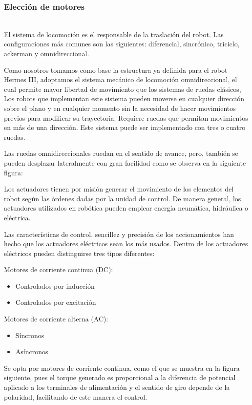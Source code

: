 \subsubsection{Elección de motores} \mbox{} \vspace{10pt} \\
El sistema de locomoción es el responsable de la traslación del robot. Las configuraciones más comunes son las siguientes: diferencial, sincrónico, triciclo, ackerman y omnidireccional.

Como nosotros tomamos como base la estructura ya definida para el robot Hermes III, adoptamos el sistema mecánico de locomoción omnidireccional, el cual permite mayor libertad de movimiento que los sistemas de ruedas clásicos, Los robots que implementan este sistema pueden moverse en cualquier dirección sobre el plano y en cualquier momento sin la necesidad de hacer movimientos previos para modificar su trayectoria. Requiere ruedas que permitan movimientos en más de una dirección. Este sistema puede ser implementado con tres o cuatro ruedas.

Las ruedas omnidireccionales ruedan en el sentido de avance, pero, también se pueden desplazar lateralmente con gran facilidad como se observa en la siguiente figura:

Los actuadores tienen por misión generar el movimiento de los elementos del robot según las órdenes dadas por la unidad de control. De manera general, los actuadores utilizados en robótica pueden emplear energía neumática, hidráulica o eléctrica.

Las características de control, sencillez y precisión de los accionamientos han hecho que los actuadores eléctricos sean los más usados. Dentro de los actuadores eléctricos pueden distinguirse tres tipos diferentes:

Motores de corriente continua (DC):
\begin{itemize}
   \item Controlados por inducción
   \item Controlados por excitación
\end{itemize}

Motores de corriente alterna (AC):
\begin{itemize}
   \item Síncronos
   \item Asíncronos
\end{itemize}

Se opta por motores de corriente continua, como el que se muestra en la figura siguiente, pues el torque generado es proporcional a la diferencia de potencial aplicado a los terminales de alimentación y el sentido de giro depende de la polaridad, facilitando de este manera el control.

